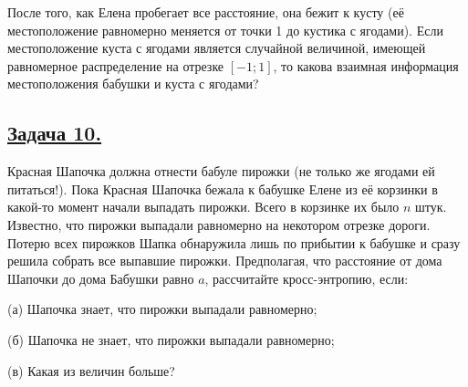 После того, как Елена пробегает все расстояние, она бежит к кусту (её местоположение равномерно меняется от точки 1 до кустика с ягодами). Если местоположение куста с ягодами является случайной величиной, имеющей равномерное распределение на отрезке $[-1; 1]$, то какова взаимная информация местоположения бабушки и куста с ягодами?
 
\subsection*{\hyperref[sec:sol_problem10]{Задача 10.}}\label{sec:problem10} Красная Шапочка должна отнести бабуле пирожки (не только же ягодами ей питаться!). Пока Красная Шапочка бежала к бабушке Елене из её корзинки в какой-то момент начали выпадать пирожки. Всего в корзинке их было $n$ штук. Известно, что пирожки выпадали равномерно на некотором отрезке дороги. Потерю всех пирожков Шапка обнаружила лишь по прибытии к бабушке и сразу решила собрать все выпавшие пирожки. Предполагая, что расстояние от дома Шапочки до дома Бабушки равно $a$, рассчитайте кросс-энтропию, если:

(а) Шапочка знает, что пирожки выпадали равномерно;

(б) Шапочка не знает, что пирожки выпадали равномерно;

(в) Какая из величин больше?

